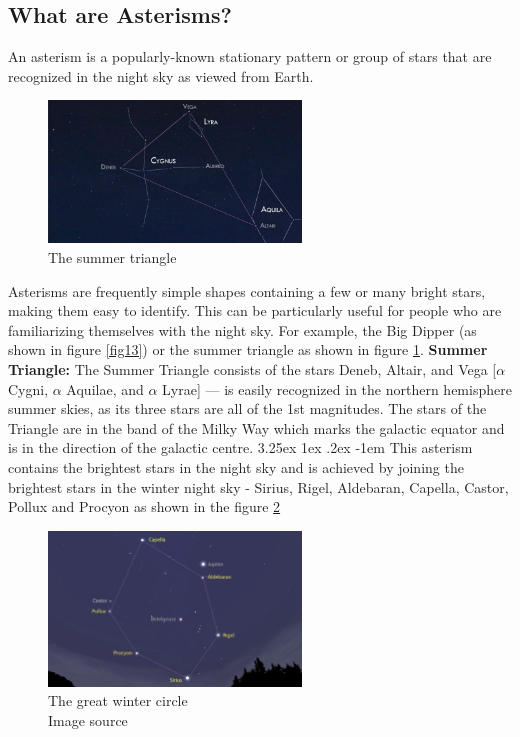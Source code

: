 \documentclass[a4paper,twoside,11pt]{article}
\makeatletter
\numberwithin{equation}{section}
\renewcommand\paragraph{\@startsection{paragraph}{5}{\z@}%
  {3.25ex \@plus1ex \@minus.2ex}%
  {-1em}%
  {\normalfont\normalsize\bfseries}}
\makeatother
\begin{document}
\subsection{What are Asterisms?}
An asterism is a popularly-known stationary pattern or group of stars that are recognized in the night sky as viewed from Earth.
\begin{figure}[h]
\centering
\includegraphics[width=0.6\textwidth]{fig14.jpg}
\caption{The summer triangle}
\label{fig14}
\end{figure}
Asterisms are frequently simple shapes containing a few or many bright stars, making them easy to identify. This can be particularly useful for people who are familiarizing themselves with the night sky. For example, the Big Dipper (as shown in figure \ref{fig13}) or the summer triangle as shown in figure \ref{fig14}.
\textbf{Summer Triangle:} The Summer Triangle consists of the stars Deneb, Altair, and Vega [$\alpha$ Cygni, $\alpha$ Aquilae, and $\alpha$ Lyrae] — is easily recognized in the northern hemisphere summer skies, as its three stars are all of the 1st magnitudes. The stars of the Triangle are in the band of the Milky Way which marks the galactic equator and is in the direction of the galactic centre.
\paragraph{}
This asterism contains the brightest stars in the night sky and is achieved by joining the brightest stars in the winter night sky - Sirius, Rigel, Aldebaran, Capella, Castor, Pollux and Procyon as shown in the figure \ref{fig24}
\begin{figure}[h]
\centering
\includegraphics[width=0.6\textwidth]{fig24.jpg}
\caption{The great winter circle \\ Image source \cite{WinterCircle}}
\label{fig24}
\end{figure}
\end{document}
